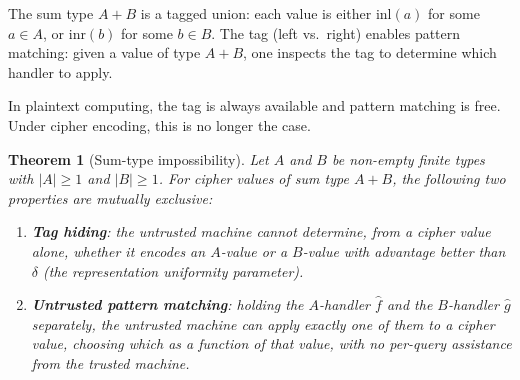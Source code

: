\documentclass[11pt]{article}
\theoremstyle{definition}
\theoremstyle{plain}
\newtheorem{theorem}{Theorem}[section]
\theoremstyle{remark}
\newcommand{\fhat}{\hat{f}}
\begin{document}
The sum type $A + B$ is a tagged union: each value is either
$\mathrm{inl}(a)$ for some $a \in A$, or $\mathrm{inr}(b)$ for some
$b \in B$.
The tag (left vs.\ right) enables pattern matching: given a value of type
$A + B$, one inspects the tag to determine which handler to apply.

In plaintext computing, the tag is always available and pattern matching
is free.
Under cipher encoding, this is no longer the case.

\begin{theorem}[Sum-type impossibility]
\label{thm:sum-impossibility}
Let $A$ and $B$ be non-empty finite types with $|A| \geq 1$ and
$|B| \geq 1$.
For cipher values of sum type $A + B$, the following two properties are
mutually exclusive:
\begin{enumerate}
\item \textbf{Tag hiding}: the untrusted machine cannot determine, from a
  cipher value alone, whether it encodes an $A$-value or a $B$-value with
  advantage better than $\delta$ (the representation uniformity parameter).
\item \textbf{Untrusted pattern matching}: holding the $A$-handler
  $\fhat$ and the $B$-handler $\hat{g}$ separately, the untrusted machine
  can apply exactly one of them to a cipher value, choosing which as a
  function of that value, with no per-query assistance from the trusted
  machine.
\end{enumerate}
\end{theorem}
\end{document}
